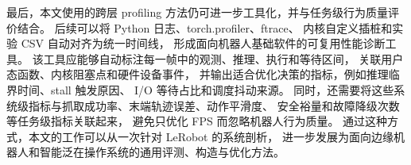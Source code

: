 最后，本文使用的跨层 profiling 方法仍可进一步工具化，并与任务级行为质量评价结合。
后续可以将 Python 日志、torch.profiler、ftrace、
内核自定义插桩和实验 CSV 自动对齐为统一时间线，
形成面向机器人基础软件的可复用性能诊断工具。
该工具应能够自动标注每一帧中的观测、推理、执行和等待区间，
关联用户态函数、内核阻塞点和硬件设备事件，
并输出适合优化决策的指标，例如推理临界时间、stall 触发原因、
I/O 等待占比和调度抖动来源。
同时，还需要将这些系统级指标与抓取成功率、末端轨迹误差、动作平滑度、
安全裕量和故障降级次数等任务级指标关联起来，
避免只优化 FPS 而忽略机器人行为质量。
通过这种方式，本文的工作可以从一次针对 LeRobot 的系统剖析，
进一步发展为面向边缘机器人和智能泛在操作系统的通用评测、构造与优化方法。
